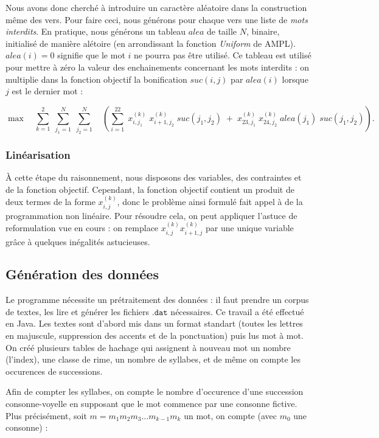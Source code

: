 \documentclass[a4paper,11pt]{article}
\begin{document}
Nous avons donc cherché à introduire un caractère aléatoire dans la construction même des vers. Pour faire ceci, nous générons pour chaque vers une liste de \textit{mots interdits}. En pratique, nous générons un tableau $alea$ de taille $N$, binaire, initialisé de manière alétoire (en arrondissant la fonction \textit{Uniform} de AMPL). $alea(i)= 0$ signifie que le mot $i$ ne pourra pas être utilisé. Ce tableau est utilisé pour mettre à zéro la valeur des enchainements concernant les mots interdits : on multiplie dans la fonction objectif la bonification $suc(i, j)$ par $alea(i)$ lorsque $j$ est le dernier mot :

\[ \max \quad  \sum_{k=1}^{2} \; \sum_{j_1=1}^{N} \; \sum_{j_2=1}^{N} \quad \left( \sum_{i=1}^{22} \; x_{i,j_1}^{(k)} \; x_{i+1,j_2}^{(k)} \; suc(j_1, j_2)  \; + \;
x_{23,j_1}^{(k)} \; x_{24,j_2}^{(k)} \; alea(j_1) \; suc(j_1, j_2) \right)
. \]

\subsubsection{Linéarisation}

\`A cette étape du raisonnement, nous disposons des variables, des contraintes et de la fonction objectif. Cependant, la fonction objectif contient un produit de deux termes de la forme $x_{i,j}^{(k)}$, donc le problème ainsi formulé fait appel à de la programmation non linéaire. Pour résoudre cela, on peut appliquer l'astuce de reformulation vue en cours : on remplace $ x_{i,j}^{(k)} x_{i+1,j}^{(k)}$
par une unique variable grâce à quelques inégalités astucieuses.

\subsection{Génération des données}

Le programme nécessite un prétraitement des données : il faut prendre un corpus de textes, les lire et générer les fichiers $\texttt{.dat}$ nécessaires. Ce travail a été effectué en Java. Les textes sont d'abord mis dans un format standart (toutes les lettres en majuscule, suppression des accents et de la ponctuation) puis lus mot à mot. On créé plusieurs tables de hachage qui assignent à nouveau mot un nombre (l'index), une classe de rime, un nombre de syllabes, et de même on compte les occurences de successions.

Afin de compter les syllabes, on compte le nombre d'occurence d'une succession consonne-voyelle en supposant que le mot commence par une consonne fictive. Plus précisément, soit $m = m_1m_2m_3 \ldots m_{k-1}m_k$ un mot, on compte (avec $m_0$ une consonne) :
\end{document}
